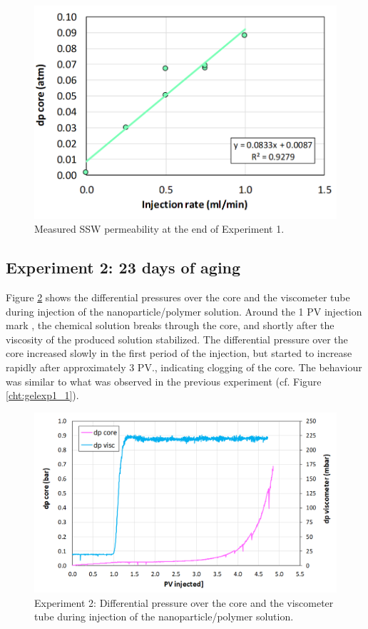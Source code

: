 \begin{figure}[h!]
    \centering
    \includegraphics[width=.9\textwidth]{img/cht/gelexp1_4.png}
    \caption{Measured SSW permeability at the end of Experiment 1.}
    \label{cht:gelexp1_4} %
\end{figure}

\FloatBarrier
\subsection{Experiment 2: 23 days of aging}
Figure \ref{cht:gelexp2_1} shows the differential pressures over the core and the viscometer tube during injection of the nanoparticle/polymer solution. Around the 1 PV injection mark , the chemical solution breaks through the core, and shortly after the viscosity of the produced solution stabilized. The differential pressure over the core increased slowly in the first period of the injection, but started to increase rapidly after approximately 3 PV., indicating clogging of the core. The behaviour was similar to what was observed in the previous experiment (cf. Figure \ref{cht:gelexp1_1}).

\begin{figure}[h!]
    \centering
    \includegraphics[width=\textwidth]{img/cht/gelexp2_1.png}
    \caption{Experiment 2: Differential pressure over the core and the viscometer tube during injection of the nanoparticle/polymer solution.}
    \label{cht:gelexp2_1} %
\end{figure}

